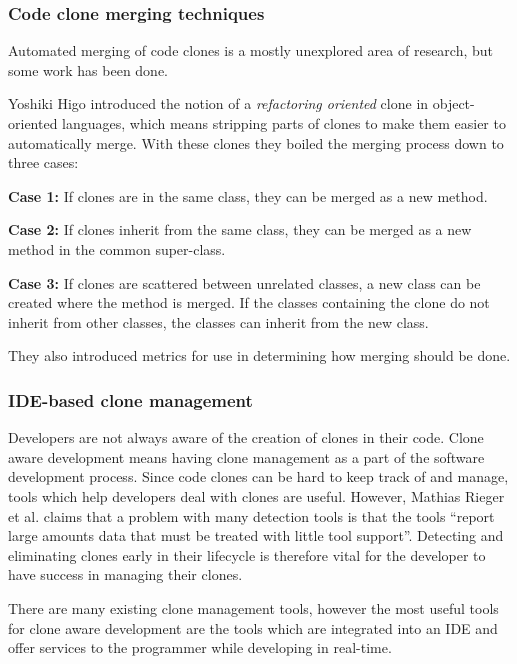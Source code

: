 \documentclass[12pt]{article}
\begin{document}
\subsubsection{Code clone merging techniques}

Automated merging of code clones is a mostly unexplored area of research, but some work has
been done.

Yoshiki Higo\cite{RefactoringOrientedClonesAndMerging} introduced the notion of a
\textit{refactoring oriented} clone in object-oriented languages, which means stripping
parts of clones to make them easier to automatically merge. With these clones they boiled
the merging process down to three cases:

\textbf{Case 1:} If clones are in the same class, they can be merged as a new method.

\textbf{Case 2:} If clones inherit from the same class, they can be merged as a new
method in the common super-class.

\textbf{Case 3:} If clones are scattered between unrelated classes, a new class can be
created where the method is merged. If the classes containing the clone do not inherit
from other classes, the classes can inherit from the new class.

They also introduced metrics for use in determining how merging should be done.

\subsubsection{IDE-based clone management}

Developers are not always aware of the creation of clones in their code. Clone aware
development means having clone management as a part of the software development
process. Since code clones can be hard to keep track of and manage, tools which help
developers deal with clones are useful. However, Mathias Rieger et al. claims that
a problem with many detection tools is that the tools ``report large amounts data that must
be treated with little tool support''\cite[1]{InsightsSystemWideDuplication}. Detecting
and eliminating clones early in their lifecycle is therefore vital for the developer to
have success in managing their clones.

There are many existing clone management tools, however the most useful tools for clone
aware development are the tools which are integrated into an IDE and offer services to the
programmer while developing in real-time.
\end{document}
